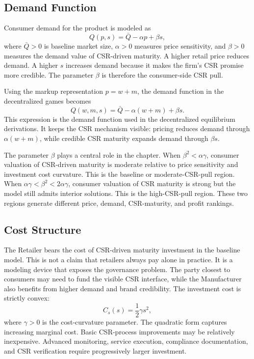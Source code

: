 \subsection{Demand Function}

Consumer demand for the product is modeled as
\begin{equation}
    Q(p,s)=\bar{Q}-\alpha p+\beta s,
    \label{eq:demand}
\end{equation}
where $\bar{Q}>0$ is baseline market size, $\alpha>0$ measures price sensitivity, and $\beta>0$ measures the demand value of CSR-driven maturity. A higher retail price reduces demand. A higher $s$ increases demand because it makes the firm's CSR promise more credible. The parameter $\beta$ is therefore the consumer-side CSR pull.

Using the markup representation $p=w+m$, the demand function in the decentralized games becomes
\begin{equation*}
    Q(w,m,s)=\bar{Q}-\alpha(w+m)+\beta s.
\end{equation*}
This expression is the demand function used in the decentralized equilibrium derivations. It keeps the CSR mechanism visible: pricing reduces demand through $\alpha(w+m)$, while credible CSR maturity expands demand through $\beta s$.

The parameter $\beta$ plays a central role in the chapter. When $\beta^2<\alpha\gamma$, consumer valuation of CSR-driven maturity is moderate relative to price sensitivity and investment cost curvature. This is the baseline or moderate-CSR-pull region. When $\alpha\gamma<\beta^2<2\alpha\gamma$, consumer valuation of CSR maturity is strong but the model still admits interior solutions. This is the high-CSR-pull region. These two regions generate different price, demand, CSR-maturity, and profit rankings.

\subsection{Cost Structure}

The Retailer bears the cost of CSR-driven maturity investment in the baseline model. This is not a claim that retailers always pay alone in practice. It is a modeling device that exposes the governance problem. The party closest to consumers may need to fund the visible CSR interface, while the Manufacturer also benefits from higher demand and brand credibility. The investment cost is strictly convex:
\begin{equation*}
    C_s(s)=\frac{1}{2}\gamma s^2,
\end{equation*}
where $\gamma>0$ is the cost-curvature parameter. The quadratic form captures increasing marginal cost. Basic CSR-process improvements may be relatively inexpensive. Advanced monitoring, service execution, compliance documentation, and CSR verification require progressively larger investment.

